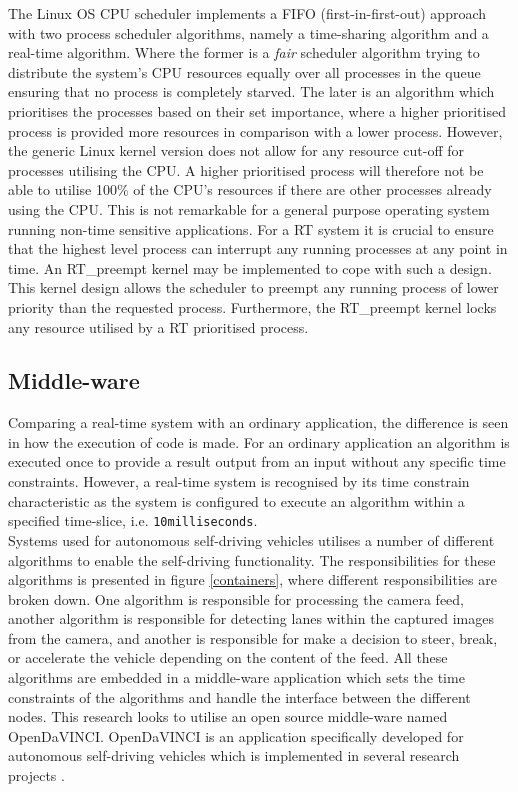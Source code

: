 The Linux OS CPU scheduler implements a FIFO (first-in-first-out) approach with two process scheduler algorithms, namely a time-sharing algorithm and a real-time algorithm. Where the former is a \textit{fair} scheduler algorithm trying to distribute the system's CPU resources equally over all processes in the queue ensuring that no process is completely starved. The later is an algorithm which prioritises the processes based on their set importance, where a higher prioritised process is provided more resources in comparison with a lower process. However, the generic Linux kernel version does not allow for any resource cut-off for processes utilising the CPU. A higher prioritised process will therefore not be able to utilise 100\% of the CPU's resources if there are other processes already using the CPU. This is not remarkable for a general purpose operating system running non-time sensitive applications. For a RT system it is crucial to ensure that the highest level process can interrupt any running processes at any point in time. An RT\_preempt kernel may be implemented to cope with such a design. This kernel design allows the scheduler to preempt any running process of lower priority than the requested process. Furthermore, the RT\_preempt kernel locks any resource utilised by a RT prioritised process.\\

\subsection{Middle-ware}

Comparing a real-time system with an ordinary application, the difference is seen in how the execution of code is made. For an ordinary application an algorithm is executed once to provide a result output from an input without any specific time constraints. However, a real-time system is recognised by its time constrain characteristic as the system is configured to execute an algorithm within a specified time-slice, i.e. \texttt{10milliseconds}.\\

Systems used for autonomous self-driving vehicles utilises a number of different algorithms to enable the self-driving functionality. The responsibilities for these algorithms is presented in figure \ref{containers}, where different responsibilities are broken down. One algorithm is responsible for processing the camera feed, another algorithm is responsible for detecting lanes within the captured images from the camera, and another is responsible for make a decision to steer, break, or accelerate the vehicle depending on the content of the feed. All these algorithms are embedded in a middle-ware application which sets the time constraints of the algorithms and handle the interface between the different nodes. This research looks to utilise an open source middle-ware named OpenDaVINCI. OpenDaVINCI is an application specifically developed for autonomous self-driving vehicles which is implemented in several research projects \cite{OpenDaVINCI}.

